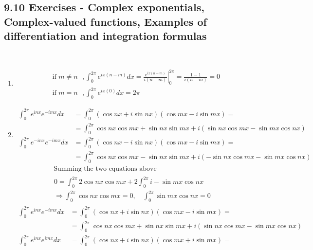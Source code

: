 \documentclass[twoside]{amsart}
\theoremstyle{plain}
\theoremstyle{definition}
\newcommand{\exercisehead}[1]
  {\smallskip
   \noindent{\small\bf Exercise #1.}}
\begin{document}
\subsection*{ 9.10 Exercises - Complex exponentials, Complex-valued functions, Examples of differentiation and integration formulas }
\quad \\ 
\exercisehead{7}
\begin{enumerate}
\item 
\[
\begin{aligned}
  & \text{ if $m\neq n$ }, \int_0^{2\pi} e^{i x ( n - m ) } dx = \left. \frac{ e^{ix (n-m)}}{ i (n - m )} \right|_0^{2\pi } = \frac{ 1 -1}{ i (n-m)} = 0 \\
  & \text{ if $m=n$ }, \int_0^{2\pi} e^{i x (0) } dx = 2\pi
\end{aligned}
\]
\item \[
    \begin{aligned}
      \int_0^{2\pi} e^{inx} e^{-i mx } dx & = \int_0^{2\pi} (\cos{nx} + i \sin{nx})( \cos{mx} -i \sin{mx}) = \\
      & = \int_0^{2\pi} \cos{nx}\cos{mx} +\sin{nx}\sin{mx} + i (\sin{nx}\cos{mx} - \sin{mx} \cos{nx} )  \\
      \int_0^{2\pi} e^{-inx} e^{-i mx } dx & = \int_0^{2\pi} (\cos{nx} - i \sin{nx})( \cos{mx} -i \sin{mx}) = \\
      & = \int_0^{2\pi} \cos{nx}\cos{mx} -\sin{nx}\sin{mx} + i (-\sin{nx}\cos{mx} - \sin{mx} \cos{nx} )  
    \end{aligned} 
\]
\[
\begin{gathered}
    \text{ Summing the two equations above } \\ 
    \begin{gathered}
      0 = \int_0^{2\pi} 2\cos{nx}\cos{mx} + 2 \int_0^{2\pi} i -\sin{mx}\cos{nx} \\
      \Longrightarrow \int_0^{2\pi} \cos{nx} \cos{mx} = 0 , \quad \int_0^{2\pi} \sin{mx}\cos{nx} = 0 
    \end{gathered} 
\end{gathered}
\]
\[
    \begin{aligned}
      \int_0^{2\pi} e^{inx} e^{-i mx } dx & = \int_0^{2\pi} (\cos{nx} + i \sin{nx})( \cos{mx} -i \sin{mx}) = \\
      & = \int_0^{2\pi} \cos{nx}\cos{mx} +\sin{nx}\sin{mx} + i (\sin{nx}\cos{mx} - \sin{mx} \cos{nx} )  \\
      \int_0^{2\pi} e^{inx} e^{i mx } dx & = \int_0^{2\pi} (\cos{nx} + i \sin{nx})( \cos{mx} +i \sin{mx}) = \\

\end{aligned}\]
\end{enumerate}
\end{document}
